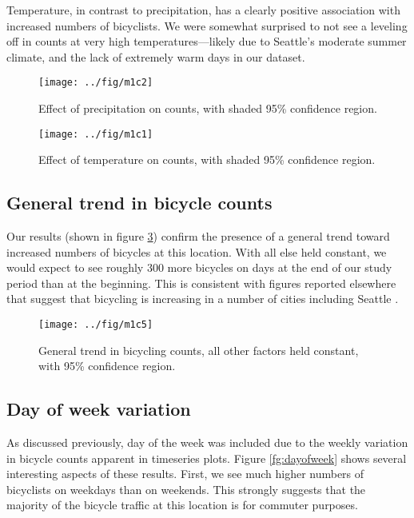 \documentclass[12pt,letterpaper,article,twocolumn]{memoir}
\begin{document}
Temperature, in contrast to precipitation, has a clearly positive
association with increased numbers of bicyclists. We were somewhat
surprised to not see a leveling off in counts at very high
temperatures---likely due to Seattle's moderate summer climate, and the
lack of extremely warm days in our dataset.

\begin{figure}[ht!]
  \centering
  \texttt{[image: ../fig/m1c2]}
  \caption{Effect of precipitation on counts, with shaded 95\%
    confidence region.}
  \label{fg:precipitation}
\end{figure}

\begin{figure}[ht!]
  \centering
  \texttt{[image: ../fig/m1c1]}
  \caption{Effect of temperature on counts, with shaded 95\%
    confidence region.}
  \label{fg:temperature}
\end{figure}


\FloatBarrier
\subsection*{General trend in bicycle counts}
Our results (shown in figure \ref{fg:trend}) confirm the presence of a
general trend toward increased numbers of bicycles at this location.
With all else held constant, we would expect to see roughly 300 more
bicycles on days at the end of our study period than at the beginning.
This is consistent with figures reported elsewhere that suggest that
bicycling is increasing in a number of cities including
Seattle \parencite{League-of-American-Bicyclists:aa}.

\begin{figure}[ht!]
  \centering
  \texttt{[image: ../fig/m1c5]}
  \caption{General trend in bicycling counts, all other factors held
    constant, with 95\% confidence region.}
  \label{fg:trend}
\end{figure}


\FloatBarrier
\subsection*{Day of week variation}
As discussed previously, day of the week was included due to the
weekly variation in bicycle counts apparent in timeseries plots.
Figure \ref{fg:dayofweek} shows several interesting aspects of these
results. First, we see much higher numbers of bicyclists on weekdays
than on weekends. This strongly suggests that the majority of the
bicycle traffic at this location is for commuter purposes.
\end{document}
